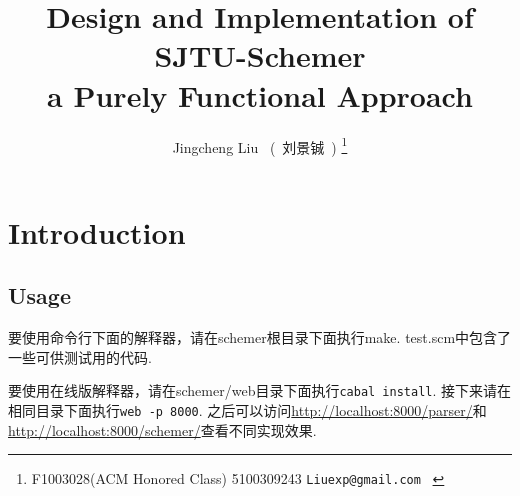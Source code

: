 \documentclass[11pt]{article}
\author{Jingcheng Liu ~(~刘景铖~) \thanks{F1003028(ACM Honored Class) 5100309243 \texttt{Liuexp@gmail.com} ~ } }
\title{Design and Implementation of SJTU-Schemer \\ \large a Purely Functional Approach}
\theoremstyle{definition}
\theoremstyle{remark}
\numberwithin{equation}{section}
\begin{document}
\maketitle

\section{Introduction}
\subsection{Usage}
要使用命令行下面的解释器，请在schemer根目录下面执行make.
test.scm中包含了一些可供测试用的代码.

要使用在线版解释器，请在schemer/web目录下面执行\verb|cabal install|.
接下来请在相同目录下面执行\verb|web -p 8000|.
之后可以访问\url{http://localhost:8000/parser/}和\url{http://localhost:8000/schemer/}查看不同实现效果.
\end{document}
